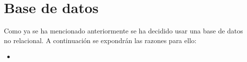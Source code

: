 \section{Base de datos}
Como ya se ha mencionado anteriormente se ha decidido usar una base
de datos no relacional. A continuación se expondrán las razones
para ello:

\begin{itemize}
    \item
\end{itemize}



